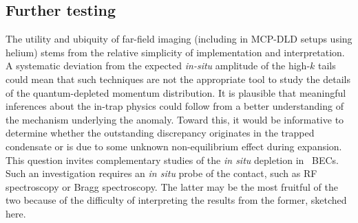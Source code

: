 {%




\subsection{Further testing}

	The utility and ubiquity of far-field imaging (including in MCP-DLD setups using helium) stems from the relative simplicity of implementation and interpretation.
	A systematic deviation from the expected \emph{in-situ} amplitude of the high-$k$ tails could mean that such techniques are not the appropriate tool to study the details of the quantum-depleted momentum distribution.
	It is plausible that meaningful inferences about the in-trap physics could follow from  a better understanding of the mechanism underlying the anomaly.
	Toward this, it would be informative to determine whether the outstanding discrepancy originates in the trapped condensate or is due to some unknown non-equilibrium effect during expansion.
	This question invites complementary studies of the \emph{in situ} depletion in \mhe~BECs. 
	Such an investigation requires an \emph{in situ} probe of the contact, such as RF spectroscopy or Bragg spectroscopy.
	The latter may be the most fruitful of the two because of the difficulty of interpreting the results from the former, sketched here.
	
}
